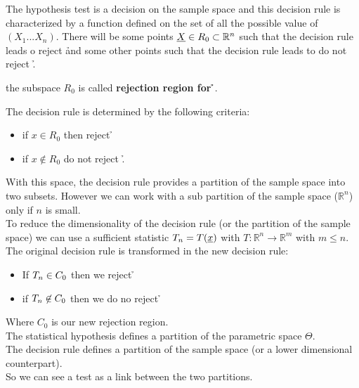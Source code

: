 The hypothesis test is a decision on the sample space and this decision rule is characterized by a function defined on the set of all the possible value of $(X_1 ...X_n)$. There will be some points $\underline X \in R_0\subset \mathbb{R}^n$ such that the decision rule leads o reject \h and some other points such that the decision rule leads to do not reject \h.\\
\begin{defi}
	the subspace $R_0$ is called \textbf{rejection region for \h}.
\end{defi}
The decision rule is determined by the following criteria:\begin{itemize}
	\item if $x\in R_0$ then reject \h
	\item if $x\not \in R_0$ do not reject \h .
\end{itemize}
With this space, the decision rule provides a partition of the sample space into two subsets. However we can work with a sub partition of the sample space ($\mathbb{R}^n$) only if $n$ is small.\\
To reduce the dimensionality of the decision rule (or the partition of the sample space) we can use a sufficient statistic $T_{n}=T(\underline x)$ with $T:\mathbb{R}^n\to \mathbb{R}^m$ with $m\leq n$. The original decision rule is transformed in the new decision rule:
\begin{itemize}
	\item If $T_{n} \in C_0$ then we reject \h
	\item if $T_{n} \not \in C_0$ then we do no reject \h
\end{itemize}
Where $C_0$ is our new rejection region.\\
The statistical hypothesis defines a partition of the parametric space $\Theta$.\\
The decision rule defines  a partition of the sample space (or a lower dimensional counterpart).\\
So we can see a test as a link between the two partitions.\\

